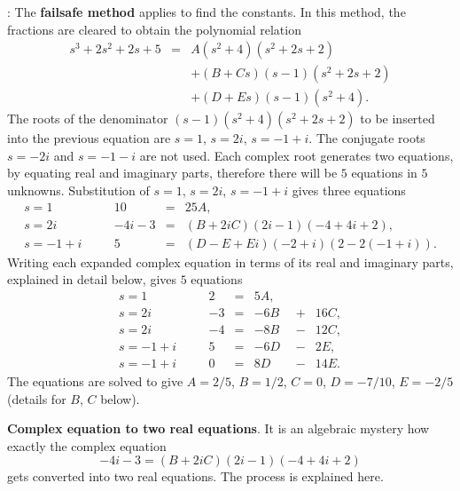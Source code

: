 \documentclass{article}
\def\df{\bfseries}
\def\dd{\displaystyle}
\def\BF#1{{\df #1}}
\newenvironment{Solution}{\par\noindent{\sffamily\bfseries\upshape Solution}:\small\rm}{\par\medskip}
\begin{document}
\begin{Solution}
The \BF{failsafe method} applies to find the constants. In this
method, the fractions are cleared to obtain the polynomial
relation
$$
\begin{array}{lcl}
\dd  {s^3+2s^2+2s+5} &=& \dd   {A} {(s^2+4)(s^2+2s+2)} \\
  & & +\dd {(B+Cs)}{(s-1)(s^2+2s+2)} \\
  & & +{{(D+Es)}{(s-1)(s^2+4)}}. \end{array}
$$
The roots of the denominator ${(s-1)(s^2+4)(s^2+2s+2)}$ to be
inserted into the previous equation are $s=1$, $s=2i$, $s=-1+i$.
The conjugate roots $s=-2i$ and $s=-1-i$ are not used. Each
complex root generates two equations, by equating real and
imaginary parts, therefore there will be $5$ equations in $5$
unknowns. Substitution of $s=1$, $s=2i$, $s=-1+i$ gives three
equations
$$
 \begin{array}{lcrcl}
 s=1 & \quad & 10 &=& 25A, \\
 s=2i & \quad & -4i-3 &=& (B+2iC)(2i-1)(-4+4i+2), \\
 s=-1+i & \quad & 5 &=& (D-E+Ei)(-2+i)(2-2(-1+i)).
 \end{array}
$$
Writing each expanded complex equation in terms of its real and
imaginary parts, explained in detail below, gives $5$ equations
$$
 \begin{array}{lcrcrcr}
 s=1 & \quad & 2 &=& 5A, & & \\
 s=2i & \quad & -3 &=& -6B\phantom{,}&+&16C, \\
 s=2i & \quad & -4 &=& -8B\phantom{,}&-&12C, \\
 s=-1+i & \quad & 5 &=& -6D\phantom{,}&-&2E, \\
 s=-1+i & \quad & 0 &=& 8D\phantom{,}&-&14E.
 \end{array}
$$
The equations are solved to give $A=2/5$, $B=1/2$, $C=0$,
$D=-7/10$, $E=-2/5$ (details for $B$, $C$ below).

\BF{Complex equation to two real equations}. It is an algebraic
mystery how exactly the complex equation
$$
 -4i-3 = (B+2iC)(2i-1)(-4+4i+2)
$$
gets converted into two real equations. The process is explained
here.


\end{Solution}
\end{document}
